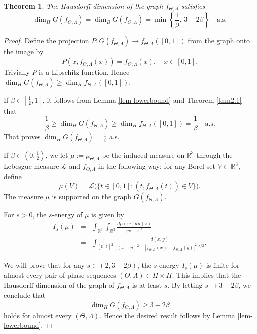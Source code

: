 \documentclass[12pt, reqno]{amsart}
\theoremstyle{plain}
\newtheorem{theorem}{Theorem}[section]
\theoremstyle{definition}
\theoremstyle{remark}
\begin{document}
  
\bigskip
  
 \begin{theorem} 
 	The Hausdorff dimension of the graph $f_{\Theta,\Lambda}$ satisfies
 	$$\dim_H G(f_{\Theta,\Lambda}) =\dim_B G(f_{\Theta,\Lambda}) = \min\left\{\frac{1}{\beta}, \, 3 -2\beta\right\} \quad \text{a.s.}$$
 \end{theorem}
 
	
\begin{proof} 
	Define the projection  $P: G(f_{\Theta,\Lambda}) \to f_{\Theta,\Lambda}([0,1])$ from the graph onto the image by 
	$$P(x, f_{\Theta,\Lambda}(x))= f_{\Theta,\Lambda}(x), \quad x\in [0,1].$$
	Trivially $P$ is a Lipschitz function.  Hence $\dim_H G(f_{\Theta,\Lambda})\ge \dim_H f_{\Theta,\Lambda}([0,1]).$
	
    If $\beta\in [\frac12, 1]$, 	it follows from  Lemma \ref{lem-lowerbound} and Theorem \ref{thm2.1} that
	$$ \frac {1}{\beta} \ge \dim_H G(f_{\Theta,\Lambda})\ge \dim_H f_{\Theta,\Lambda}([0,1])=\frac{1}{\beta} \quad \text{a.s.}$$
	That proves  $\dim_H G(f_{\Theta,\Lambda}) = \frac {1}{\beta}$ a.s.
	
	 If $\beta\in (0, \frac12)$,  we let   \( \mu:= \mu_{\Theta,\Lambda} \) be the induced measure on $\mathbb{R}^3$ through the Lebesgue measure  \( {\mathcal L} \) and $f_{\Theta,\Lambda}$ in the following way: for any Borel set \( V \subset \mathbb{R}^3 \), define
	\begin{equation*}
		\mu (V) = {\mathcal L}\bigl(\{t \in [0,1] : (t, f_{\Theta,\Lambda}(t)) \in V\}\bigr).
	\end{equation*} 
	The measure $\mu$ is supported on the graph  $G(f_{\Theta,\Lambda})$.  
	
	For $s>0$, the \(s\)-energy of \( \mu \)  is given by
	\begin{eqnarray*}
			I_s(\mu)
			&=& \int_{\mathbb{R}^3} \int_{\mathbb{R}^3}\frac{d\mu(w)d\mu(z)}{|w-z|^s} \\
			&=& \int_{[0,1]^2} \frac{d(x,y)}{\bigl((x-y)^2 + |f_{\Theta,\Lambda}(x)-f_{\Theta,\Lambda}(y)|^2\bigr)^{s/2}}.
	\end{eqnarray*}
	
	We will prove that for any \( s\in (2, 3-2\beta) \), the \(s\)-energy \( I_s(\mu) \) is finite for almost every pair of phase sequences \( (\Theta,\Lambda) \in H \times H \). This implies that the Hausdorff dimension of the graph of \( f_{\Theta,\Lambda} \) is at least \( s \). By letting \( s \to 3-2\beta \), we conclude that
	\[
	\dim_H G(f_{\Theta,\Lambda}) \ge 3-2\beta
	\]
	holds for almost every \( (\Theta,\Lambda) \). Hence the desired result follows by Lemma \ref{lem-lowerbound}.
	

\end{proof}
\end{document}
